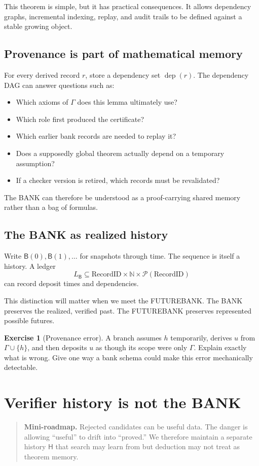 \documentclass[11pt,openany]{book}
\theoremstyle{definition}
\newtheorem{exercise}[theorem]{Exercise}
\theoremstyle{remark}
\newenvironment{miniroadmap}{\begin{quote}\small\color{deepblue}\textbf{Mini-roadmap.} }{\end{quote}}
\newcommand{\Bank}{\mathsf{B}}
\newcommand{\Hist}{\mathsf{H}}
\newcommand{\N}{\mathbb{N}}
\begin{document}
This theorem is simple, but it has practical consequences. It allows dependency graphs, incremental indexing, replay, and audit trails to be defined against a stable growing object.

\section{Provenance is part of mathematical memory}
For every derived record $r$, store a dependency set $\operatorname{dep}(r)$. The dependency DAG can answer questions such as:
\begin{itemize}
\item Which axioms of $\Gamma$ does this lemma ultimately use?
\item Which role first produced the certificate?
\item Which earlier bank records are needed to replay it?
\item Does a supposedly global theorem actually depend on a temporary assumption?
\item If a checker version is retired, which records must be revalidated?
\end{itemize}

The BANK can therefore be understood as a proof-carrying shared memory rather than a bag of formulas.

\section{The BANK as realized history}
Write $\Bank(0),\Bank(1),\ldots$ for snapshots through time. The sequence is itself a history. A ledger
\[
L_{\Bank}\subseteq \mathrm{RecordID}\times\N\times\mathcal P(\mathrm{RecordID})
\]
can record deposit times and dependencies.

This distinction will matter when we meet the FUTUREBANK. The BANK preserves the realized, verified past. The FUTUREBANK preserves represented possible futures.

\begin{exercise}[Provenance error]\label{ex:scope}
A branch assumes $h$ temporarily, derives $u$ from $\Gamma\cup\{h\}$, and then deposits $u$ as though its scope were only $\Gamma$. Explain exactly what is wrong. Give one way a bank schema could make this error mechanically detectable.
\end{exercise}

\chapter{Verifier history is not the BANK}
\begin{miniroadmap}
Rejected candidates can be useful data. The danger is allowing ``useful'' to drift into ``proved.'' We therefore maintain a separate history $\Hist$ that search may learn from but deduction may not treat as theorem memory.
\end{miniroadmap}
\end{document}
